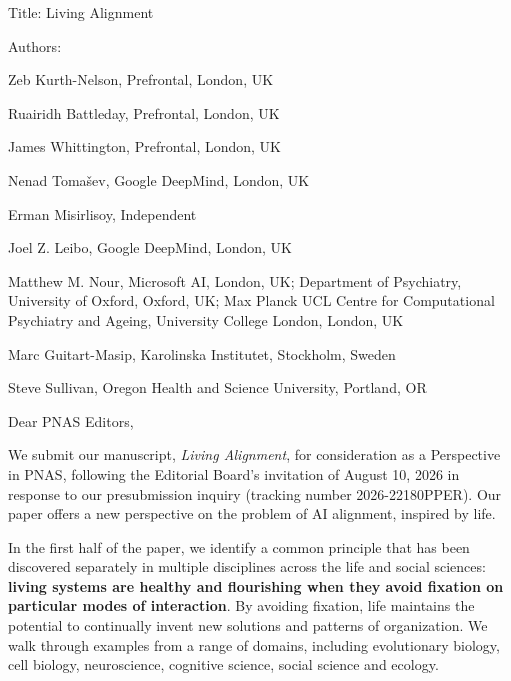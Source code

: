 \documentclass[fontsize=11.5pt]{scrartcl}
\begin{document}
\pagestyle{empty}

\begingroup
\small
\setlength{\leftskip}{1.5em}%
Title:
Living Alignment

Authors:\par
{\setlength{\parskip}{0pt}%
Zeb Kurth-Nelson, Prefrontal, London, UK\par
Ruairidh Battleday, Prefrontal, London, UK\par
James Whittington, Prefrontal, London, UK\par
Nenad Tomašev, Google DeepMind, London, UK\par
Erman Misirlisoy, Independent\par
Joel Z. Leibo, Google DeepMind, London, UK\par
Matthew M. Nour, Microsoft AI, London, UK; Department of Psychiatry, University of Oxford, Oxford, UK; Max Planck UCL Centre for Computational Psychiatry and Ageing, University College London, London, UK\par
Marc Guitart-Masip, Karolinska Institutet, Stockholm, Sweden\par
Steve Sullivan, Oregon Health and Science University, Portland, OR\par}



\endgroup

\vspace{1em}

Dear PNAS Editors,

We submit our manuscript, \textit{Living Alignment}, for consideration as a Perspective in PNAS, following the Editorial Board's invitation of August 10, 2026 in response to our presubmission inquiry (tracking number 2026-22180PPER). Our paper offers a new perspective on the problem of AI alignment, inspired by life.

In the first half of the paper, we identify a common principle that has been discovered separately in multiple disciplines across the life and social sciences: \textbf{living systems are healthy and flourishing when they avoid fixation on particular modes of interaction}. By avoiding fixation, life maintains the potential to continually invent new solutions and patterns of organization. We walk through examples from a range of domains, including evolutionary biology, cell biology, neuroscience, cognitive science, social science and ecology. 
\end{document}
